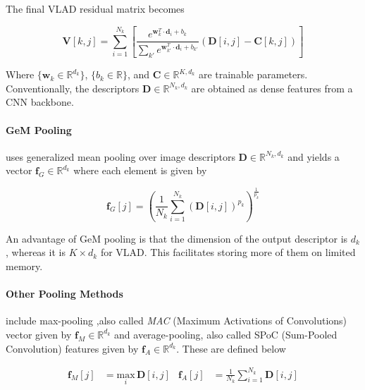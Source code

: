 The final VLAD residual matrix becomes

\begin{equation}
    \mathbf{V}[k, j] = \sum_{i=1}^{N_k} \left[ 
        \frac{e^{\mathbf{w}_k^T \cdot \mathbf{d}_i + b_k}}{\sum_{k'}
            e^{\mathbf{w}_{k'}^T \cdot \mathbf{d}_i + b_{k'}}}
        \left ( \mathbf{D}[i, j] - \mathbf{C}[k, j] \right ) \right]
\end{equation}

Where $\{\mathbf{w}_k \in \mathbb{R}^{d_k}\}$, $\{b_k \in
\mathbb{R}\}$, and $\mathbf{C} \in \mathbb{R}^{K, d_k}$ are trainable
parameters. Conventionally, the descriptors $\mathbf{D} \in
\mathbb{R}^{N_k, d_k}$ are obtained as dense features from a CNN
backbone.

\paragraph{GeM Pooling \cite{Radenovic2017FineTuningCI}} uses
generalized mean pooling over image descriptors $\mathbf{D} \in
\mathbb{R}^{N_k, d_k}$ and yields a vector $\mathbf{f}_G \in
\mathbb{R}^{d_k}$ where each element is given by

\begin{equation}
    \mathbf{f}_G[j] = \left( \frac{1}{N_k} \sum_{i=1}^{N_k} 
        \left(\mathbf{D}[i, j]\right)^{p_k}\right)^{\frac{1}{p_k}}
\end{equation}

An advantage of GeM pooling is that the dimension of the output
descriptor is $d_k$, whereas it is $K \times d_k$ for VLAD. This
facilitates storing more of them on limited memory.

\paragraph{Other Pooling Methods} include max-pooling ,also called
\emph{MAC} (Maximum Activations of Convolutions) vector
\cite{Razavian2014VisualIR, Tolias2015ParticularOR} given by
$\mathbf{f}_M \in \mathbb{R}^{d_k}$ and average-pooling, also called
SPoC (Sum-Pooled Convolution) features \cite{Babenko2015AggregatingLD}
given by $\mathbf{f}_A \in \mathbb{R}^{d_k}$. These are defined below

\begin{align}
    \mathbf{f}_M[j] &= \underset{i}{\mathrm{max}} \, \mathbf{D}[i, j]
    &
    \mathbf{f}_A[j] &= \frac{1}{N_k} \sum_{i=1}^{N_k} \mathbf{D}[i,j]
\end{align}

